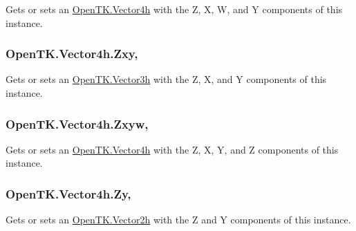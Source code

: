 Gets or sets an \hyperlink{struct_open_t_k_1_1_vector4h}{Open\-T\-K.\-Vector4h} with the Z, X, W, and Y components of this instance. 

\hypertarget{struct_open_t_k_1_1_vector4h_a755da32dba1d3799367e10a2f9295f36}{
\subsubsection[{Zxy}]{ Open\-T\-K.\-Vector4h.\-Zxy\hspace{0.3cm}{\ttfamily [get]}, {\ttfamily [set]}}}\label{struct_open_t_k_1_1_vector4h_a755da32dba1d3799367e10a2f9295f36}


Gets or sets an \hyperlink{struct_open_t_k_1_1_vector3h}{Open\-T\-K.\-Vector3h} with the Z, X, and Y components of this instance. 

\hypertarget{struct_open_t_k_1_1_vector4h_a53535428f111b43a9a5c2647873d8cac}{
\subsubsection[{Zxyw}]{ Open\-T\-K.\-Vector4h.\-Zxyw\hspace{0.3cm}{\ttfamily [get]}, {\ttfamily [set]}}}\label{struct_open_t_k_1_1_vector4h_a53535428f111b43a9a5c2647873d8cac}


Gets or sets an \hyperlink{struct_open_t_k_1_1_vector4h}{Open\-T\-K.\-Vector4h} with the Z, X, Y, and Z components of this instance. 

\hypertarget{struct_open_t_k_1_1_vector4h_a84a12f9550c2b7b6997c4c8c82d7a614}{
\subsubsection[{Zy}]{ Open\-T\-K.\-Vector4h.\-Zy\hspace{0.3cm}{\ttfamily [get]}, {\ttfamily [set]}}}\label{struct_open_t_k_1_1_vector4h_a84a12f9550c2b7b6997c4c8c82d7a614}


Gets or sets an \hyperlink{struct_open_t_k_1_1_vector2h}{Open\-T\-K.\-Vector2h} with the Z and Y components of this instance. 


